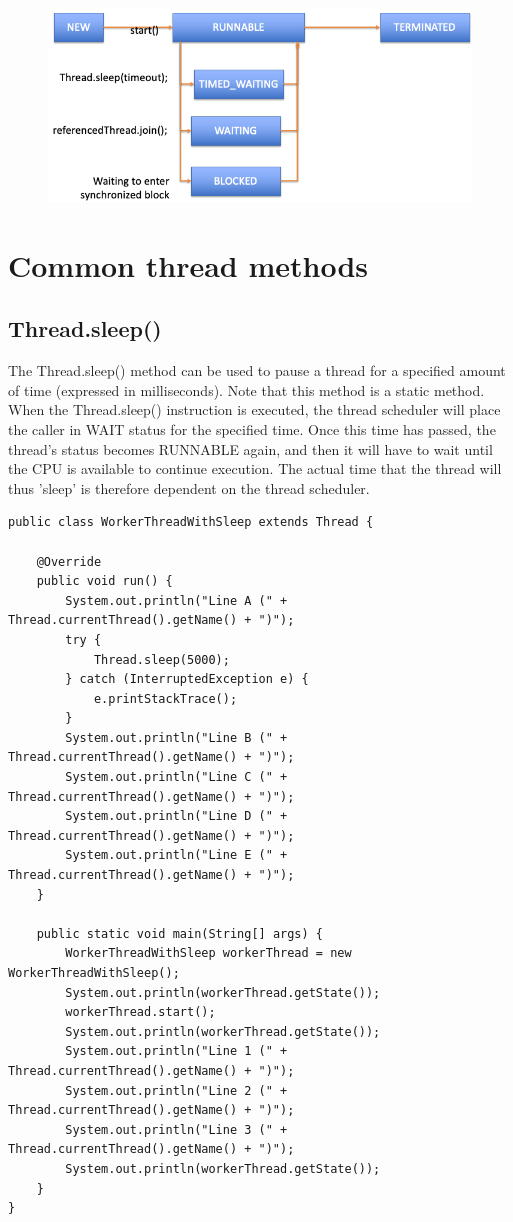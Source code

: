 \begin{figure}[H]
  \includegraphics[width=\linewidth]{images/h9/thread_life_cycle.png}
  \label{fig:thread_life_cycle}
\end{figure}

\section{Common thread methods}


\subsection{Thread.sleep()}

The Thread.sleep() method can be used to pause a thread for a specified amount of time (expressed in milliseconds).
Note that this method is a static method.
When the Thread.sleep() instruction is executed, the thread scheduler will place the caller in WAIT status for the specified time. Once this time has passed, the thread's status becomes RUNNABLE again, and then it will have to wait until the CPU is available to continue execution. The actual time that the thread will thus 'sleep' is therefore dependent on the thread scheduler.

\begin{lstlisting}
public class WorkerThreadWithSleep extends Thread {

	@Override
	public void run() {
		System.out.println("Line A (" + Thread.currentThread().getName() + ")");
		try {
			Thread.sleep(5000);
		} catch (InterruptedException e) {
			e.printStackTrace();
		}
		System.out.println("Line B (" + Thread.currentThread().getName() + ")");
		System.out.println("Line C (" + Thread.currentThread().getName() + ")");
		System.out.println("Line D (" + Thread.currentThread().getName() + ")");
		System.out.println("Line E (" + Thread.currentThread().getName() + ")");
	}

	public static void main(String[] args) {
		WorkerThreadWithSleep workerThread = new WorkerThreadWithSleep();
		System.out.println(workerThread.getState());
		workerThread.start();
		System.out.println(workerThread.getState());
		System.out.println("Line 1 (" + Thread.currentThread().getName() + ")");
		System.out.println("Line 2 (" + Thread.currentThread().getName() + ")");
		System.out.println("Line 3 (" + Thread.currentThread().getName() + ")");
		System.out.println(workerThread.getState());
	}
}
\end{lstlisting}

